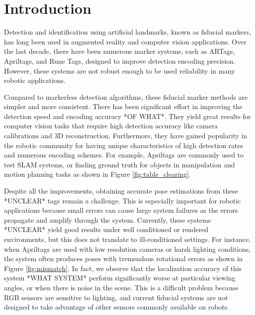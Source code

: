 \section{Introduction}
\label{sec:intro}
Detection and identification using artificial landmarks, known as fiducial markers, has long been used in augmented reality and computer vision applications. Over the last decade, there have been numerous marker systems, such as ARTags, Apriltags, and Rune Tags, designed to improve detection encoding precision. However, these systems are not robust enough to be used reliability in many robotic applications.

Compared to markerless detection algorithms, these fiducial marker methods are simpler and more consistent. There has been significant effort in improving the detection speed and encoding accuracy *OF WHAT*. They yield great results for computer vision tasks that require high detection accuracy like camera calibrations and 3D reconstruction. Furthermore, they have gained popularity in the robotic community for having unique characteristics of high detection rates and numerous encoding schemes. For example, Apriltags are commonly used to test SLAM systems, or finding ground truth for objects in manipulation and motion planning tasks as shown in Figure \ref{fig:table_clearing}. 

Despite all the improvements, obtaining accurate pose estimations from these *UNCLEAR* tags remain a challenge. This is especially important for robotic applications because small errors can cause large system failures as the errors propagate and amplify through the system. Currently, these systems *UNCLEAR* yield good results under well conditioned or rendered environments, but this does not translate to ill-conditioned settings. For instance, when Apriltags are used with low resolution cameras or harsh lighting conditions, the system often produces poses with tremendous rotational errors as shown in Figure \ref{fig:mismatch}. In fact, we observe that the localization accuracy of this system *WHAT SYSTEM* perform significantly worse at particular viewing angles, or when there is noise in the scene. This is a difficult problem because RGB sensors are sensitive to lighting, and current fiducial systems are not designed to take advantage of other sensors commonly available on robots.

